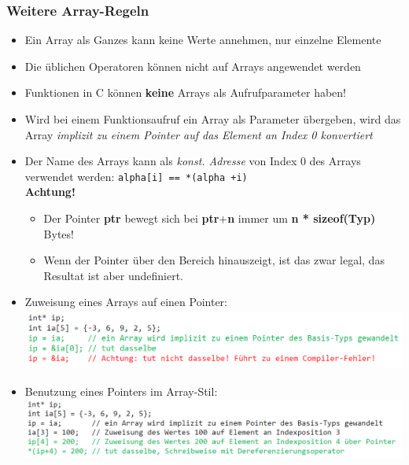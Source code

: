 		\subsubsection{Weitere Array-Regeln}
			\begin{itemize}
				\item Ein Array als Ganzes kann keine Werte annehmen, nur einzelne Elemente
				\item Die üblichen Operatoren können nicht auf Arrays angewendet werden
				\item Funktionen in C können \textbf{keine} Arrays als Aufrufparameter haben!
				\item Wird bei einem Funktionsaufruf ein Array als Parameter übergeben, wird das Array \textit{implizit zu einem Pointer auf das Element an Index 0 konvertiert}
				\item Der Name des Arrays kann als \textit{konst. Adresse} von Index 0 des Arrays verwendet werden: \verb|alpha[i] == *(alpha +i)| \\
				\textbf{Achtung!}
				\begin{itemize}
					\item Der Pointer \textbf{ptr} bewegt sich bei \textbf{ptr$+$n} immer um \textbf{n * sizeof(Typ)} Bytes!
					\item Wenn der Pointer über den Bereich hinauszeigt, ist das zwar legal, das Resultat ist aber undefiniert.
				\end{itemize}
				\item Zuweisung eines Arrays auf einen Pointer:\\
				\includegraphics[height=2cm]{Bilder/arr-ptr-zuweisung.png}
				\item Benutzung eines Pointers im Array-Stil:\\
				\includegraphics[height=2cm]{Bilder/ptr-im-arr-stil.png}	
			\end{itemize}

